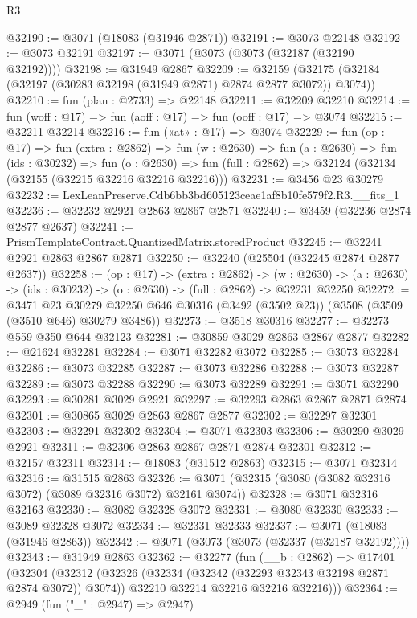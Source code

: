 \begin{lexlean}{R3}
\begin{coremodule}
@32190 := @3071 (@18083 (@31946 @2871))
@32191 := @3073 @22148
@32192 := @3073 @32191
@32197 := @3071 (@3073 (@3073 (@32187 (@32190 @32192))))
@32198 := @31949 @2867
@32209 := @32159 (@32175 (@32184 (@32197 (@30283 @32198 (@31949 @2871) @2874 @2877 @3072)) @3074))
@32210 := fun (plan : @2733) => @22148
@32211 := @32209 @32210
@32214 := fun (woff : @17) => fun (aoff : @17) => fun (ooff : @17) => @3074
@32215 := @32211 @32214
@32216 := fun («at» : @17) => @3074
@32229 := fun (op : @17) =>
  fun (extra : @2862) =>
  fun (w : @2630) =>
  fun (a : @2630) =>
  fun (ids : @30232) =>
  fun (o : @2630) => fun (full : @2862) => @32124 (@32134 (@32155 (@32215 @32216 @32216 @32216)))
@32231 := @3456 @23 @30279
@32232 := LexLeanPreserve.Cdb6bb3bd605123ceae1af8b10fe579f2.R3.__fits_1
@32236 := @32232 @2921 @2863 @2867 @2871
@32240 := @3459 (@32236 @2874 @2877 @2637)
@32241 := PrismTemplateContract.QuantizedMatrix.storedProduct
@32245 := @32241 @2921 @2863 @2867 @2871
@32250 := @32240 (@25504 (@32245 @2874 @2877 @2637))
@32258 := (op : @17) ->
  (extra : @2862) ->
  (w : @2630) -> (a : @2630) -> (ids : @30232) -> (o : @2630) -> (full : @2862) -> @32231 @32250
@32272 := @3471
    @23
    @30279
    @32250
    @646
    @30316
    (@3492 (@3502 @23))
    (@3508 (@3509 (@3510 @646) @30279 @3486))
@32273 := @3518 @30316
@32277 := @32273 @559 @350 @644 @32123
@32281 := @30859 @3029 @2863 @2867 @2877
@32282 := @21624 @32281
@32284 := @3071 @32282 @3072
@32285 := @3073 @32284
@32286 := @3073 @32285
@32287 := @3073 @32286
@32288 := @3073 @32287
@32289 := @3073 @32288
@32290 := @3073 @32289
@32291 := @3071 @32290
@32293 := @30281 @3029 @2921
@32297 := @32293 @2863 @2867 @2871 @2874
@32301 := @30865 @3029 @2863 @2867 @2877
@32302 := @32297 @32301
@32303 := @32291 @32302
@32304 := @3071 @32303
@32306 := @30290 @3029 @2921
@32311 := @32306 @2863 @2867 @2871 @2874 @32301
@32312 := @32157 @32311
@32314 := @18083 (@31512 @2863)
@32315 := @3071 @32314
@32316 := @31515 @2863
@32326 := @3071 (@32315 (@3080 (@3082 @32316 @3072) (@3089 @32316 @3072) @32161 @3074))
@32328 := @3071 @32316 @32163
@32330 := @3082 @32328 @3072
@32331 := @3080 @32330
@32333 := @3089 @32328 @3072
@32334 := @32331 @32333
@32337 := @3071 (@18083 (@31946 @2863))
@32342 := @3071 (@3073 (@3073 (@32337 (@32187 @32192))))
@32343 := @31949 @2863
@32362 := @32277
    (fun (__b : @2862) =>
    @17401
      (@32304
        (@32312
          (@32326 (@32334 (@32342 (@32293 @32343 @32198 @2871 @2874 @3072)) @3074))
          @32210
          @32214
          @32216
          @32216
          @32216)))
@32364 := @2949 (fun ("_" : @2947) => @2947)

\end{coremodule}
\end{lexlean}
